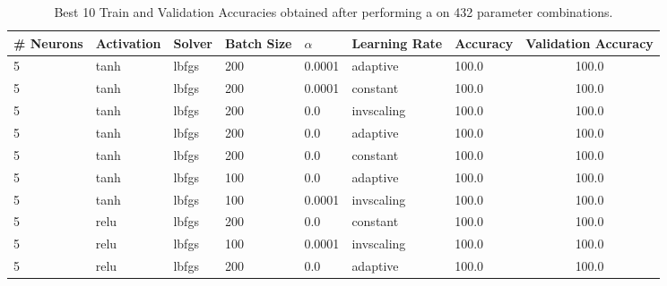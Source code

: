 \def\arraystretch{1.25}
\begin{table}[H]
\centering
{\small
\begin{tabular}{l l l l l l l c}
\hline
\hline
\textbf{\# Neurons} & \textbf{Activation} & \textbf{Solver} & \textbf{Batch Size} & \textbf{$\alpha$} & \textbf{Learning Rate} & \textbf{Accuracy} & \textbf{Validation Accuracy} \\
\hline
\hline
5 & tanh & lbfgs & 200 & 0.0001 & adaptive & 100.0 & 100.0 \\
5 & tanh & lbfgs & 200 & 0.0001 & constant & 100.0 & 100.0 \\
5 & tanh & lbfgs & 200 & 0.0 & invscaling & 100.0 & 100.0 \\
5 & tanh & lbfgs & 200 & 0.0 & adaptive & 100.0 & 100.0 \\
5 & tanh & lbfgs & 200 & 0.0 & constant & 100.0 & 100.0 \\
5 & tanh & lbfgs & 100 & 0.0 & adaptive & 100.0 & 100.0 \\
5 & tanh & lbfgs & 100 & 0.0001 & invscaling & 100.0 & 100.0 \\
5 & relu & lbfgs & 200 & 0.0 & constant & 100.0 & 100.0 \\
5 & relu & lbfgs & 100 & 0.0001 & invscaling & 100.0 & 100.0 \\
5 & relu & lbfgs & 200 & 0.0 & adaptive & 100.0 & 100.0 \\
\hline
\end{tabular}
\caption{Best 10 Train and Validation Accuracies obtained after performing a  on 432 parameter combinations.}
}
\end{table}